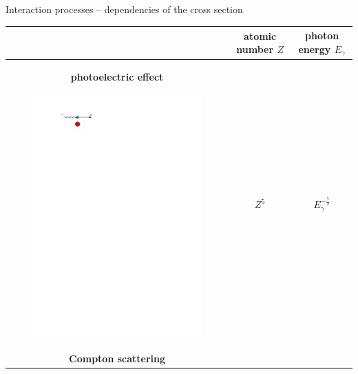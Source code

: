 \documentclass[11pt,xcolor=dvipsnames,professionalfonts,notes]{beamer}
\begin{document}
\begin{frame}{Interaction processes -- dependencies of the cross section}
	\begin{center}
		\begin{tabular}{ccc}
			\toprule
			& atomic number $Z$ & photon energy $E_\gamma$\\
			\midrule
			\begin{minipage}{0.3\textwidth}
				\centering
				\textbf{photoelectric effect}
				
				\vspace{0.1cm}
				
				\includegraphics[width=0.8\textwidth]{./figures/photoeffect_intro.pdf} 
				
				\vspace{0.4cm}
			\end{minipage} & $Z^5$ & $E_\gamma^{-\frac{7}{2}}$ \\
			
			\begin{minipage}{0.3\textwidth}
				\centering
				\textbf{Compton scattering}
				
				\vspace{0.1cm}
				

\end{minipage}
\end{tabular}
\end{center}
\end{frame}
\end{document}
